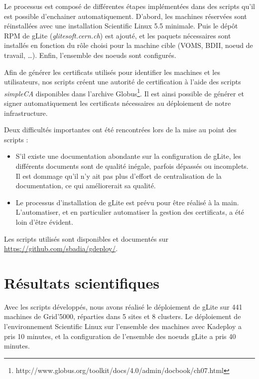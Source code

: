 \documentclass[a4paper,11pt]{article}
\begin{document}
Le processus est composé de différentes étapes implémentées dans des
scripts qu'il est possible d'enchainer automatiquement.  D'abord, les machines
réservées sont réinstallées avec une installation Scientific Linux 5.5
minimale. Puis le dépôt RPM de gLite (\textsl{glitesoft.cern.ch}) est ajouté,
et les paquets nécessaires sont installés en fonction du rôle choisi pour la
machine cible (VOMS, BDII, noeud de travail, \ldots). Enfin, l'ensemble des
noeuds sont configurés.

Afin de générer les certificats utilisés pour identifier les machines et les
utilisateurs, nos scripts créent une autorité de certification à l'aide des
scripts \textsl{simpleCA} disponibles dans l'archive
Globus\footnote{http://www.globus.org/toolkit/docs/4.0/admin/docbook/ch07.html}.
Il est ainsi possible de générer et signer automatiquement les certificats
nécessaires au déploiement de notre infrastructure.

Deux difficultés importantes ont été rencontrées lors de la mise au point des scripts :

\begin{itemize}

\item S'il existe une documentation abondante sur la configuration de gLite,
	les différents documents sont de qualité inégale, parfois dépassés ou
	incomplets. Il est dommage qu'il n'y ait pas  plus d'effort de
	centralisation de la documentation, ce qui améliorerait sa qualité.

\item Le processus d'installation de gLite est prévu pour être réalisé à la
	main. L'automatiser, et en particulier automatiser la gestion des
	certificats, a été loin d'être évident.

\end{itemize}

Les scripts utilisés sont disponibles et documentés sur \url{https://github.com/sbadia/gdeploy/}.

\section{Résultats scientifiques}

Avec les scripts développés, nous avons réalisé le déploiement de gLite sur 441
machines de Grid'5000, réparties dans 5 sites et 8 clusters. Le déploiement
de l'environnement Scientific Linux sur l'ensemble des machines avec Kadeploy a
pris 10 minutes, et la configuration de l'ensemble des noeuds gLite a pris 40
minutes.
\end{document}
